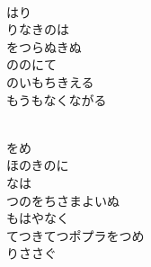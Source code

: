 \documentclass[10pt,b5j]{tarticle} %
\begin{document}
\vspace{1.5em} %
\newcommand{\linespace}{0.5em} %
\newcommand{\blocksize}{0.5\hsize} %
\newcommand{\itemmargin}{3em} %
\begin{enumerate} %
    \setlength{\itemindent}{\itemmargin} %
    \begin{minipage}[c]{\blocksize}
    
        \vspace{\linespace}
        \item~\\
        はり\\
        りなきのは\\
        をつらぬきぬ\\
        ののにて\\
        のいもちきえる\\
        もうもなくながる
        
    \end{minipage}
    \begin{minipage}[c]{\blocksize}
        
        \vspace{\linespace}
        \item~\\
        をめ\\
        ほのきのに\\
        なは\\
        つのをちさまよいぬ\\
        もはやなく\\
        てつきてつポプラをつめ\\
        りささぐ
        
    \end{minipage}
    \begin{minipage}[c]{\blocksize}
        

\end{minipage}
\end{enumerate}
\end{document}
